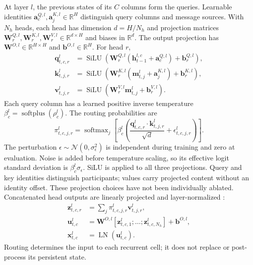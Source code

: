 \documentclass[letterpaper,twoside]{article}
\begin{document}
At layer $l$, the previous states of its $C$ columns form the queries. Learnable identities $\mathbf{a}_c^{Q,l},\mathbf{a}_j^{K,l}\in\mathbb{R}^{H}$ distinguish query columns and message sources. With $N_h$ heads, each head has dimension $d=H/N_h$ and projection matrices $\mathbf{W}_r^{Q,l},\mathbf{W}_r^{K,l},\mathbf{W}_r^{V,l}\in\mathbb{R}^{d\times H}$ and biases in $\mathbb{R}^{d}$. The output projection has $\mathbf{W}^{O,l}\in\mathbb{R}^{H\times H}$ and $\mathbf{b}^{O,l}\in\mathbb{R}^{H}$. For head $r$,
\begin{align}
\mathbf{q}_{t,c,r}^l &=
    \operatorname{SiLU}\!\left(
    \mathbf{W}_r^{Q,l}(\mathbf{h}_{t-1}^{l,c}+\mathbf{a}_c^{Q,l})+\mathbf{b}_r^{Q,l}
    \right), \\
\mathbf{k}_{t,j,r}^l &=
    \operatorname{SiLU}\!\left(
    \mathbf{W}_r^{K,l}(\mathbf{m}_{t,j}^l+\mathbf{a}_j^{K,l})+\mathbf{b}_r^{K,l}
    \right), \\
\mathbf{v}_{t,j,r}^l &=
    \operatorname{SiLU}\!\left(
    \mathbf{W}_r^{V,l}\mathbf{m}_{t,j}^l+\mathbf{b}_r^{V,l}
    \right).
\end{align}
Each query column has a learned positive inverse temperature $\beta_c^l=\operatorname{softplus}(\rho_c^l)$. The routing probabilities are
\begin{equation}
\pi_{t,c,j,r}^l =
\operatorname{softmax}_j\!\left[
\beta_c^l\left(
\frac{\mathbf{q}_{t,c,r}^l \cdot \mathbf{k}_{t,j,r}^l}{\sqrt{d}}
+ \epsilon_{t,c,j,r}^l
\right)\right].
\end{equation}
The perturbation $\epsilon\sim\mathcal{N}(0,\sigma_\epsilon^2)$ is independent during training and zero at evaluation. Noise is added before temperature scaling, so its effective logit standard deviation is $\beta_c^l\sigma_\epsilon$. SiLU \citep{elfwing2018silu} is applied to all three projections. Query and key identities distinguish participants; values carry projected content without an identity offset. These projection choices have not been individually ablated. Concatenated head outputs are linearly projected and layer-normalized \citep{ba2016layernorm}:
\begin{equation}
\begin{aligned}
\mathbf{z}_{t,c,r}^l
    &= \sum_j \pi_{t,c,j,r}^l\mathbf{v}_{t,j,r}^l,\\
\mathbf{u}_{t,c}^l
    &= \mathbf{W}^{O,l}[\mathbf{z}_{t,c,1}^l;\ldots;\mathbf{z}_{t,c,N_h}^l]
       +\mathbf{b}^{O,l},\\
\mathbf{x}_{t,c}^l
    &= \operatorname{LN}(\mathbf{u}_{t,c}^l).
\end{aligned}
\end{equation}
Routing determines the input to each recurrent cell; it does not replace or post-process its persistent state.
\end{document}
